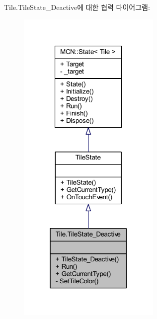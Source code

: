 Tile.\+Tile\+State\+\_\+\+Deactive에 대한 협력 다이어그램\+:\nopagebreak
\begin{figure}[H]
\begin{center}
\leavevmode
\includegraphics[width=195pt]{class_tile_1_1_tile_state___deactive__coll__graph}
\end{center}
\end{figure}
